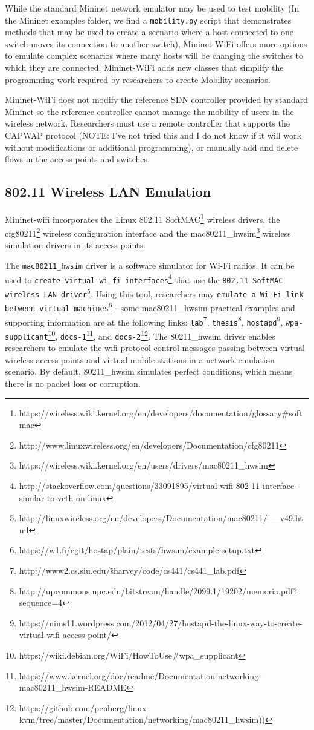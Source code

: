 While the standard Mininet network emulator may be used to test mobility (In the Mininet examples folder, we find a \texttt{mobility.py} script that demonstrates methods that may be used to create a scenario where a host connected to one switch moves its connection to another switch), Mininet-WiFi offers more options to emulate complex scenarios where many hosts will be changing the switches to which they are connected. Mininet-WiFi adds new classes that simplify the programming work required by researchers to create Mobility scenarios.

Mininet-WiFi does not modify the reference SDN controller provided by standard Mininet so the reference controller cannot manage the mobility of users in the wireless network. Researchers must use a remote controller that supports the CAPWAP protocol (NOTE: I've not tried this and I do not know if it will work without modifications or additional programming), or manually add and delete flows in the access points and switches.

\subsection{802.11 Wireless LAN Emulation}

Mininet-wifi incorporates the Linux 802.11 SoftMAC\footnote{https://wireless.wiki.kernel.org/en/developers/documentation/glossary\#softmac} wireless drivers, the cfg80211\footnote{http://www.linuxwireless.org/en/developers/Documentation/cfg80211} wireless configuration interface and the mac80211\_hwsim\footnote{https://wireless.wiki.kernel.org/en/users/drivers/mac80211\_hwsim} wireless simulation drivers in its access points. 

The \texttt{mac80211\_hwsim} driver is a software simulator for Wi-Fi radios. It can be used to \texttt{create virtual wi-fi interfaces}\footnote{http://stackoverflow.com/questions/33091895/virtual-wifi-802-11-interface-similar-to-veth-on-linux} that use the \texttt{802.11 SoftMAC wireless LAN driver}\footnote{http://linuxwireless.org/en/developers/Documentation/mac80211/\_\_v49.html}. Using this tool, researchers may \texttt{emulate a Wi-Fi link between virtual machines}\footnote{https://w1.fi/cgit/hostap/plain/tests/hwsim/example-setup.txt} - some mac80211\_hwsim practical examples and supporting information are at the following links: \texttt{lab}\footnote{http://www2.cs.siu.edu/\~sharvey/code/cs441/cs441\_lab.pdf}, \texttt{thesis}\footnote{http://upcommons.upc.edu/bitstream/handle/2099.1/19202/memoria.pdf?sequence=4}, \texttt{hostapd}\footnote{https://nims11.wordpress.com/2012/04/27/hostapd-the-linux-way-to-create-virtual-wifi-access-point/}, \texttt{wpa-supplicant}\footnote{https://wiki.debian.org/WiFi/HowToUse\#wpa\_supplicant}, \texttt{docs-1}\footnote{https://www.kernel.org/doc/readme/Documentation-networking-mac80211\_hwsim-README}, and \texttt{docs-2}\footnote{https://github.com/penberg/linux-kvm/tree/master/Documentation/networking/mac80211\_hwsim))}. The 80211\_hwsim driver enables researchers to emulate the wifi protocol control messages passing between virtual wireless access points and virtual mobile stations in a network emulation scenario. By default, 80211\_hwsim simulates perfect conditions, which means there is no packet loss or corruption.

